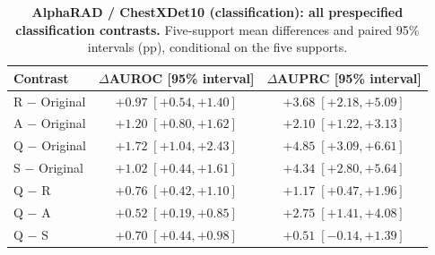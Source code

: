 \begin{table}[tp]
\centering
\caption{\textbf{AlphaRAD / ChestXDet10 (classification): all prespecified classification contrasts.} Five-support mean differences and paired 95\% intervals (pp), conditional on the five supports.}
\label{tab:supp-path-ci-chestxdet10}
\footnotesize
\setlength{\tabcolsep}{4pt}
\begin{tabular*}{\textwidth}{@{\extracolsep{\fill}}lcc@{}}
\toprule
Contrast & $\Delta$AUROC [95\% interval] & $\Delta$AUPRC [95\% interval] \\
\midrule
R $-$ Original & $+0.97\;[+0.54,+1.40]$ & $+3.68\;[+2.18,+5.09]$ \\
A $-$ Original & $+1.20\;[+0.80,+1.62]$ & $+2.10\;[+1.22,+3.13]$ \\
Q $-$ Original & $+1.72\;[+1.04,+2.43]$ & $+4.85\;[+3.09,+6.61]$ \\
S $-$ Original & $+1.02\;[+0.44,+1.61]$ & $+4.34\;[+2.80,+5.64]$ \\
Q $-$ R & $+0.76\;[+0.42,+1.10]$ & $+1.17\;[+0.47,+1.96]$ \\
Q $-$ A & $+0.52\;[+0.19,+0.85]$ & $+2.75\;[+1.41,+4.08]$ \\
Q $-$ S & $+0.70\;[+0.44,+0.98]$ & $+0.51\;[-0.14,+1.39]$ \\
\bottomrule
\end{tabular*}
\end{table}
